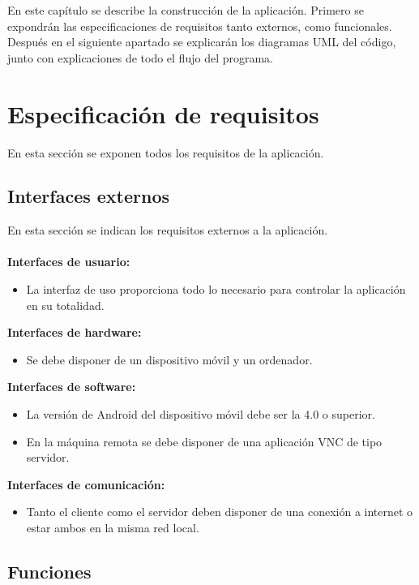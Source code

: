 En este capítulo se describe la construcción de la aplicación. Primero se expondrán las especificaciones de requisitos tanto externos, como funcionales. Después en el siguiente apartado se explicarán los diagramas UML del código, junto con explicaciones de todo el flujo del programa.

\section {Especificaci\'on de requisitos}

En esta sección se exponen todos los requisitos de la aplicación.

\subsection {Interfaces externos}

En esta sección se indican los requisitos externos a la aplicación.\\ \\
\textbf{Interfaces de usuario:}
\begin{itemize}
\item La interfaz de uso proporciona todo lo necesario para controlar la aplicación en su totalidad.\\
\end{itemize}
\textbf{Interfaces de hardware:}
\begin{itemize}
\item Se debe disponer de un dispositivo móvil y un ordenador.\\
\end{itemize}
\textbf{Interfaces de software:}
\begin{itemize}
\item La versión de Android del dispositivo móvil debe ser la 4.0 o superior.
\item En la máquina remota se debe disponer de una aplicación VNC de tipo servidor.\\
\end{itemize}
\textbf{Interfaces de comunicación:}
\begin{itemize}
\item Tanto el cliente como el servidor deben disponer de una conexión a internet o estar ambos en la misma red local.\\
\end{itemize}
\subsection {Funciones}

